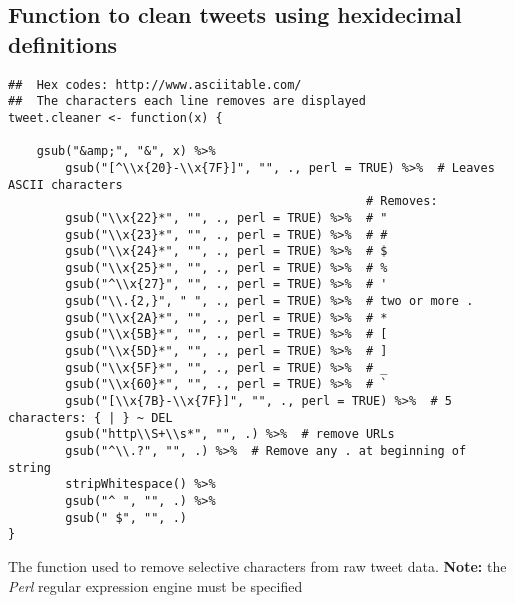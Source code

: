 \documentclass{article}
\begin{document}
\subsection{Function to clean tweets using hexidecimal definitions \label{hex-function}}
\label{sec-3-4}

\begin{listing}[H]
\begin{verbatim}
##  Hex codes: http://www.asciitable.com/
##  The characters each line removes are displayed
tweet.cleaner <- function(x) {

    gsub("&amp;", "&", x) %>%
        gsub("[^\\x{20}-\\x{7F}]", "", ., perl = TRUE) %>%  # Leaves ASCII characters
                                                  # Removes:
        gsub("\\x{22}*", "", ., perl = TRUE) %>%  # "        
        gsub("\\x{23}*", "", ., perl = TRUE) %>%  # #           
        gsub("\\x{24}*", "", ., perl = TRUE) %>%  # $
        gsub("\\x{25}*", "", ., perl = TRUE) %>%  # %
        gsub("^\\x{27}", "", ., perl = TRUE) %>%  # '                
        gsub("\\.{2,}", " ", ., perl = TRUE) %>%  # two or more .
        gsub("\\x{2A}*", "", ., perl = TRUE) %>%  # *
        gsub("\\x{5B}*", "", ., perl = TRUE) %>%  # [
        gsub("\\x{5D}*", "", ., perl = TRUE) %>%  # ]
        gsub("\\x{5F}*", "", ., perl = TRUE) %>%  # _
        gsub("\\x{60}*", "", ., perl = TRUE) %>%  # `
        gsub("[\\x{7B}-\\x{7F}]", "", ., perl = TRUE) %>%  # 5 characters: { | } ~ DEL
        gsub("http\\S+\\s*", "", .) %>%  # remove URLs
        gsub("^\\.?", "", .) %>%  # Remove any . at beginning of string
        stripWhitespace() %>%
        gsub("^ ", "", .) %>%
        gsub(" $", "", .)
}
\end{verbatim}
\caption[R function to clean raw Twitter data]{\label{mycode:tweet-cleaner}The function used to remove selective characters from raw tweet data. \textbf{Note:} the \emph{Perl} regular expression engine must be specified}
\end{listing}
\end{document}
